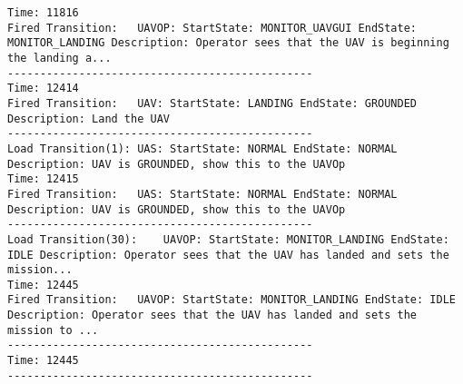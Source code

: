 \begin{spacing}{1}
\begin{verbatim}
Time: 11816
Fired Transition:	UAVOP: StartState: MONITOR_UAVGUI EndState: MONITOR_LANDING Description: Operator sees that the UAV is beginning the landing a...
-----------------------------------------------
Time: 12414
Fired Transition:	UAV: StartState: LANDING EndState: GROUNDED Description: Land the UAV
-----------------------------------------------
Load Transition(1):	UAS: StartState: NORMAL EndState: NORMAL Description: UAV is GROUNDED, show this to the UAVOp
Time: 12415
Fired Transition:	UAS: StartState: NORMAL EndState: NORMAL Description: UAV is GROUNDED, show this to the UAVOp
-----------------------------------------------
Load Transition(30):	UAVOP: StartState: MONITOR_LANDING EndState: IDLE Description: Operator sees that the UAV has landed and sets the mission...
Time: 12445
Fired Transition:	UAVOP: StartState: MONITOR_LANDING EndState: IDLE Description: Operator sees that the UAV has landed and sets the mission to ...
-----------------------------------------------
Time: 12445
-----------------------------------------------
\end{verbatim}
\end{spacing}
